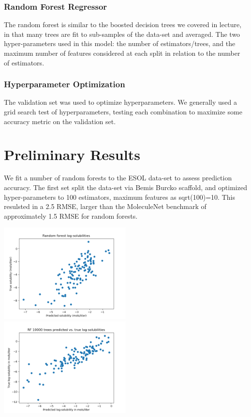 \documentclass{article}
\begin{document}
\subsubsection{Random Forest Regressor}

The random forest is similar to the boosted decision trees we covered in lecture, in that many trees are fit to sub-samples of the data-set and averaged. The two hyper-parameters used in this model: the number of estimators/trees, and the maximum number of features considered at each split in relation to the number of estimators.

\subsubsection{Hyperparameter Optimization}

The validation set was used to optimize hyperparameters. We generally used a grid search test of hyperparameters, testing each combination to maximize some accuracy metric on the validation set.

\section{Preliminary Results}

We fit a number of random forests to the ESOL data-set to assess prediction accuracy. The first set split the data-set via Bemis Burcko scaffold, and optimized hyper-parameters to 100 estimators, maximum features as sqrt(100)=10. This resulsted in a 2.5 RMSE, larger than the MoleculeNet benchmark of approximately 1.5 RMSE for random forests.

\includegraphics[width=0.5\textwidth]{RFesol}
\includegraphics[width=0.5\textwidth]{rfesolrandom10000}
\end{document}
